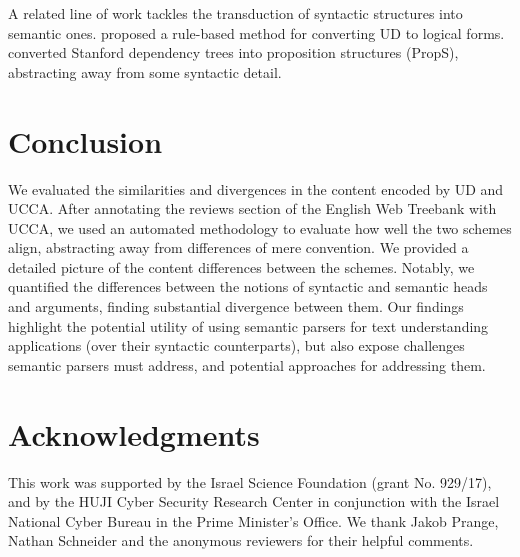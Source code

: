 \documentclass[11pt,a4paper,table]{article}
\begin{document}
A related line of work tackles the transduction of syntactic structures into semantic ones.
 proposed a rule-based method for converting UD
to logical forms.
 converted Stanford dependency trees into
proposition structures ({\sc PropS}), abstracting away from some syntactic detail.


\section{Conclusion}\label{sec:conclusion}

We evaluated the similarities and divergences in the content encoded by UD and UCCA. 
After annotating the reviews section of the English Web Treebank with UCCA,
  we used an automated methodology to evaluate how well the two schemes align,
  abstracting away from differences of mere convention.
We provided a detailed picture of the content differences between the schemes.
Notably, we quantified the differences between the notions of syntactic and semantic heads
  and arguments, finding substantial divergence between them.
Our findings highlight the potential utility of using semantic parsers for text understanding applications
  (over their syntactic counterparts), but also expose challenges semantic parsers must address,
  and potential approaches for addressing them.

\section*{Acknowledgments}

This work was supported by the Israel Science Foundation (grant No. 929/17),
and by the HUJI Cyber Security Research Center
in conjunction with the Israel National Cyber Bureau in the Prime Minister's Office.
We thank Jakob Prange, Nathan Schneider
and the anonymous reviewers for their helpful comments.




\end{document}
